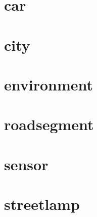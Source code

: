 \documentclass{article}
\begin{document}
\section{car}


\section{city}


\section{environment}


\section{roadsegment}


\section{sensor}


\section{streetlamp}

\end{document}
